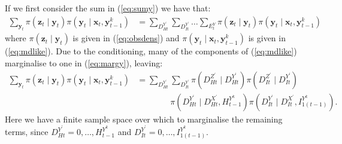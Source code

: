 \documentclass[a4paper]{article}
\newcommand{\bx}{\bm{x}}
\newcommand{\by}{\bm{y}}
\newcommand{\bz}{\bm{z}}
\begin{document}
If we first consider the sum in (\ref{eq:sumy}) we have that:
\begin{align}
    \sum_{\by_t} \pi\left(\bz_t \mid \by_t\right)\pi\left(\by_t \mid \bx_t, \by^k_{t - 1}\right) &= \sum_{D^{Y^\prime}_{Ht}}\sum_{D^{Y^\prime}_{It}}\dots\sum_{E^Y_t} \pi\left(\bz_t \mid \by_t\right)\pi\left(\by_t \mid \bx_t, \by^k_{t - 1}\right)\label{eq:margy}
\end{align}
where $\pi\left(\bz_t \mid \by_t\right)$ is given in (\ref{eq:obsdens}) and $\pi\left(\by_t \mid \bx_t, \by^k_{t - 1}\right)$ is given in (\ref{eq:mdlike}). Due to the conditioning, many of the components of (\ref{eq:mdlike}) marginalise to one in (\ref{eq:margy}), leaving:
\begin{align}
    \sum_{\by_t} \pi\left(\bz_t \mid \by_t\right)\pi\left(\by_t \mid \bx_t, \by^k_{t - 1}\right) &= \sum_{D^{Y^\prime}_{Ht}}\sum_{D^{Y^\prime}_{It}} \pi\left(D^{Z^\prime}_{Ht} \mid D^{Y^\prime}_{Ht}\right)\pi\left(D^{Z^\prime}_{It} \mid D^{Y^\prime}_{It}\right) \nonumber\\
    & \qquad \qquad \pi\left(D^{Y^\prime}_{Ht} \mid D^{X^\prime}_{Ht}, H^{Y^k}_{t - 1}\right)\pi\left(D^{Y^\prime}_{It} \mid D^{X^\prime}_{It}, I^{Y^k}_{1(t - 1)}\right).\label{eq:margy1}
\end{align}
Here we have a finite sample space over which to marginalise the remaining terms, since $D^{Y^\prime}_{Ht} = 0, \dots, H^{Y^k}_{t - 1}$ and $D^{Y^\prime}_{It} = 0, \dots, I^{Y^k}_{1(t - 1)}$.
\end{document}
